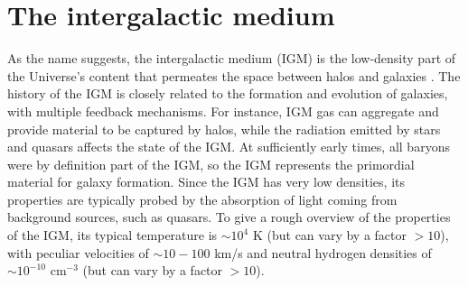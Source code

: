 \section{The intergalactic medium}\label{sec:IGM}
As the name suggests, the intergalactic medium (IGM) is the low-density part of the Universe's content that permeates the space between halos and galaxies \cite{Mo2010}. The history of the IGM is closely related to the formation and evolution of galaxies, with multiple feedback mechanisms. For instance, IGM gas can aggregate and provide material to be captured by halos, while the radiation emitted by stars and quasars affects the state of the IGM. At sufficiently early times, all baryons were by definition part of the IGM, so the IGM represents the primordial material for galaxy formation. Since the IGM has very low densities, its properties are typically probed by the absorption of light coming from background sources, such as quasars. To give a rough overview of the properties of the IGM, its typical temperature is $\sim 10^4$ K (but can vary by a factor $>10$), with peculiar velocities of $\sim 10-100$ km/s and neutral hydrogen densities of $\sim 10^{-10}$ cm$^{-3}$ (but can vary by a factor $>10$).

